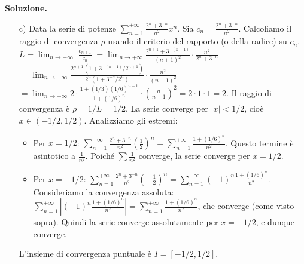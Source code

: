 \documentclass[12pt, a4paper]{article}
\newenvironment{solution}{%
    \par\noindent\textbf{Soluzione.}\medskip\par
    \normalfont
}{\par\bigskip}
\begin{document}
\begin{solution}
\begin{enumerate}
    \item[c)] Data la serie di potenze $\displaystyle\sum_{n=1}^{+\infty} \frac{2^{n}+3^{-n}}{n^{2}}x^{n}$.
    Sia $c_n = \frac{2^{n}+3^{-n}}{n^{2}}$. Calcoliamo il raggio di convergenza $\rho$ usando il criterio del rapporto (o della radice) su $c_n$.
    $L = \lim_{n\to+\infty} \left|\frac{c_{n+1}}{c_n}\right| = \lim_{n\to+\infty} \frac{2^{n+1}+3^{-(n+1)}}{(n+1)^2} \cdot \frac{n^2}{2^n+3^{-n}}$
    $= \lim_{n\to+\infty} \frac{2^{n+1}(1+3^{-(n+1)}/2^{n+1})}{2^n(1+3^{-n}/2^n)} \cdot \frac{n^2}{(n+1)^2}$
    $= \lim_{n\to+\infty} 2 \cdot \frac{1+(1/3)(1/6)^{n+1}}{1+(1/6)^n} \cdot \left(\frac{n}{n+1}\right)^2 = 2 \cdot 1 \cdot 1 = 2$.
    Il raggio di convergenza è $\rho = 1/L = 1/2$.
    La serie converge per $|x| < 1/2$, cioè $x \in (-1/2, 1/2)$.
    Analizziamo gli estremi:
    \begin{itemize}
        \item Per $x = 1/2$: $\displaystyle\sum_{n=1}^{+\infty} \frac{2^{n}+3^{-n}}{n^{2}} \left(\frac{1}{2}\right)^n = \sum_{n=1}^{+\infty} \frac{1+(1/6)^n}{n^2}$.
        Questo termine è asintotico a $\frac{1}{n^2}$. Poiché $\sum \frac{1}{n^2}$ converge, la serie converge per $x=1/2$.
        \item Per $x = -1/2$: $\displaystyle\sum_{n=1}^{+\infty} \frac{2^{n}+3^{-n}}{n^{2}} \left(-\frac{1}{2}\right)^n = \sum_{n=1}^{+\infty} (-1)^n \frac{1+(1/6)^n}{n^2}$.
        Consideriamo la convergenza assoluta: $\sum_{n=1}^{+\infty} \left|(-1)^n \frac{1+(1/6)^n}{n^2}\right| = \sum_{n=1}^{+\infty} \frac{1+(1/6)^n}{n^2}$, che converge (come visto sopra).
        Quindi la serie converge assolutamente per $x=-1/2$, e dunque converge.
    \end{itemize}
    L'insieme di convergenza puntuale è $I = [-1/2, 1/2]$.
\end{enumerate}
\end{solution}
\end{document}
